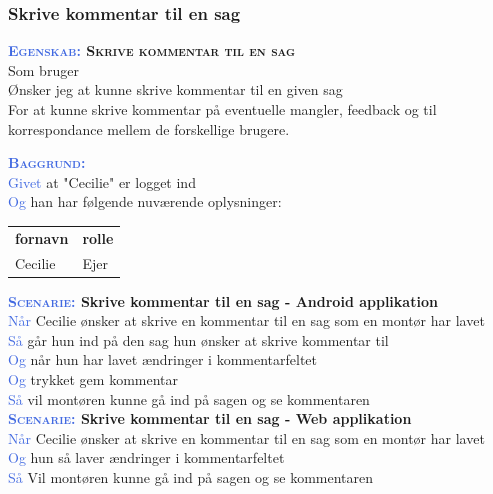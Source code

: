 \subsubsection{Skrive kommentar til en sag}
\textbf{\textsc{\textcolor{RoyalBlue}{Egenskab:} Skrive kommentar til en sag}}\\
Som bruger\\
Ønsker jeg at kunne skrive kommentar til en given sag\\
For at kunne skrive kommentar på eventuelle mangler, feedback og til korrespondance mellem de forskellige brugere.

\textsc{\textcolor{RoyalBlue}{\textbf{Baggrund:}}}\\
\textcolor{RoyalBlue}{Givet} at "Cecilie" er logget ind\\
\textcolor{RoyalBlue}{Og} han har følgende nuværende oplysninger:\\
\begin{tabular}{| l | l |}
	\textbf{fornavn} & \textbf{rolle} \\
	Cecilie & Ejer\\
\end{tabular}
\newline \newline

\textbf{\textsc{\textcolor{RoyalBlue}{Scenarie:}} Skrive kommentar til en sag - Android applikation}\\
\textcolor{RoyalBlue}{Når} Cecilie ønsker at skrive en kommentar til en sag som en montør har lavet\\
\textcolor{RoyalBlue}{Så} går hun ind på den sag hun ønsker at skrive kommentar til \\
\textcolor{RoyalBlue}{Og} når hun har lavet ændringer i kommentarfeltet\\
\textcolor{RoyalBlue}{Og} trykket gem kommentar\\
\textcolor{RoyalBlue}{Så} vil montøren kunne gå ind på sagen og se kommentaren\\

\textbf{\textsc{\textcolor{RoyalBlue}{Scenarie:}} Skrive kommentar til en sag - Web applikation}\\
\textcolor{RoyalBlue}{Når} Cecilie ønsker at skrive en kommentar til en sag som en montør har lavet\\
\textcolor{RoyalBlue}{Og} hun så laver ændringer i kommentarfeltet\\
\textcolor{RoyalBlue}{Så} Vil montøren kunne gå ind på sagen og se kommentaren\\


